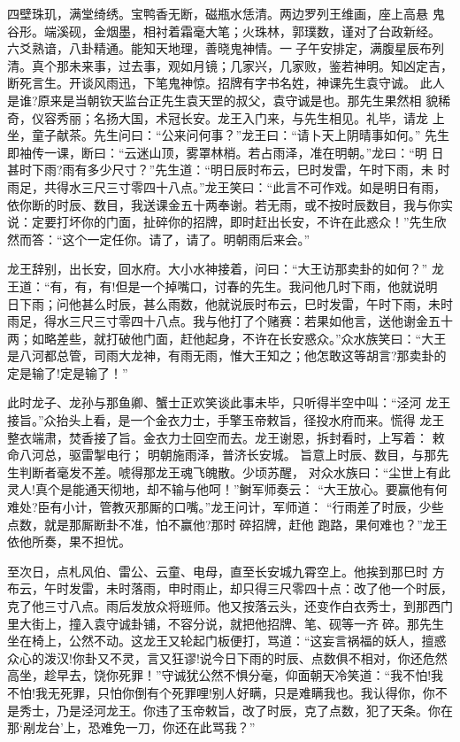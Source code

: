 四壁珠玑，满堂绮绣。宝鸭香无断，磁瓶水恁清。两边罗列王维画，座上高悬
鬼谷形。端溪砚，金烟墨，相衬着霜毫大笔；火珠林，郭璞数，谨对了台政新经。
六爻熟谙，八卦精通。能知天地理，善晓鬼神情。一子午安排定，满腹星辰布列
清。真个那未来事，过去事，观如月镜；几家兴，几家败，鉴若神明。知凶定吉，
断死言生。开谈风雨迅，下笔鬼神惊。招牌有字书名姓，神课先生袁守诚。
此人是谁?原来是当朝钦天监台正先生袁天罡的叔父，袁守诚是也。那先生果然相
貌稀奇，仪容秀丽；名扬大国，术冠长安。龙王入门来，与先生相见。礼毕，请龙
上坐，童子献茶。先生问曰：“公来问何事？”龙王曰：“请卜天上阴晴事如何。”
先生即袖传一课，断曰：“云迷山顶，雾罩林梢。若占雨泽，准在明朝。”龙曰：“明
日甚时下雨?雨有多少尺寸？”先生道：“明日辰时布云，巳时发雷，午时下雨，未
时雨足，共得水三尺三寸零四十八点。”龙王笑曰：“此言不可作戏。如是明日有雨，
依你断的时辰、数目，我送课金五十两奉谢。若无雨，或不按时辰数目，我与你实
说：定要打坏你的门面，扯碎你的招牌，即时赶出长安，不许在此惑众！”先生欣
然而答：“这个一定任你。请了，请了。明朝雨后来会。”

龙王辞别，出长安，回水府。大小水神接着，问曰：“大王访那卖卦的如何？”
龙王道：“有，有，有!但是一个掉嘴口，讨春的先生。我问他几时下雨，他就说明
日下雨；问他甚么时辰，甚么雨数，他就说辰时布云，巳时发雷，午时下雨，未时
雨足，得水三尺三寸零四十八点。我与他打了个赌赛：若果如他言，送他谢金五十
两；如略差些，就打破他门面，赶他起身，不许在长安惑众。”众水族笑曰：“大王
是八河都总管，司雨大龙神，有雨无雨，惟大王知之；他怎敢这等胡言?那卖卦的
定是输了!定是输了！”

此时龙子、龙孙与那鱼卿、蟹士正欢笑谈此事未毕，只听得半空中叫：“泾河
龙王接旨。”众抬头上看，是一个金衣力士，手擎玉帝敕旨，径投水府而来。慌得
龙王整衣端肃，焚香接了旨。金衣力士回空而去。龙王谢恩，拆封看时，上写着：
敕命八河总，驱雷掣电行；
明朝施雨泽，普济长安城。
旨意上时辰、数目，与那先生判断者毫发不差。唬得那龙王魂飞魄散。少顷苏醒，
对众水族曰：“尘世上有此灵人!真个是能通天彻地，却不输与他呵！”鲥军师奏云：
“大王放心。要赢他有何难处?臣有小计，管教灭那厮的口嘴。”龙王问计，军师道：
“行雨差了时辰，少些点数，就是那厮断卦不准，怕不赢他?那时碎招牌，赶他
跑路，果何难也？”龙王依他所奏，果不担忧。

至次日，点札风伯、雷公、云童、电母，直至长安城九霄空上。他挨到那巳时
方布云，午时发雷，未时落雨，申时雨止，却只得三尺零四十点：改了他一个时辰，
克了他三寸八点。雨后发放众将班师。他又按落云头，还变作白衣秀士，到那西门
里大街上，撞入袁守诚卦铺，不容分说，就把他招牌、笔、砚等一齐碎。那先生
坐在椅上，公然不动。这龙王又轮起门板便打，骂道：“这妄言祸福的妖人，擅惑
众心的泼汉!你卦又不灵，言又狂谬!说今日下雨的时辰、点数俱不相对，你还危然
高坐，趁早去，饶你死罪！”守诚犹公然不惧分毫，仰面朝天冷笑道：“我不怕!我
不怕!我无死罪，只怕你倒有个死罪哩!别人好瞒，只是难瞒我也。我认得你，你不
是秀士，乃是泾河龙王。你违了玉帝敕旨，改了时辰，克了点数，犯了天条。你在
那‘剐龙台’上，恐难免一刀，你还在此骂我？”

